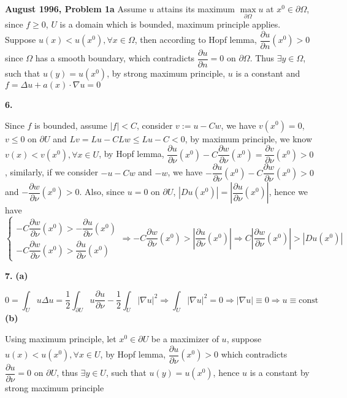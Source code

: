 \documentclass[../main.tex]{subfiles}
\begin{document}
\begin{customproblem}\textbf{August 1996, Problem 1a}
Assume $u$ attains its maximum $\displaystyle\underset{\partial\Omega}{\max}u$ at $x^0\in\partial\Omega$, since $f\geq 0$, $U$ is a domain which is bounded, maximum principle applies. Suppose $u(x)<u(x^0), \forall x\in \Omega$, then according to Hopf lemma, $\dfrac{\partial u}{\partial n}(x^0)>0$ since $\Omega$ has a smooth boundary, which contradicts $\dfrac{\partial u}{\partial n}=0$ on $\partial\Omega$. Thus $\exists y\in\Omega$, such that $u(y)=u(x^0)$, by strong maximum principle, $u$ is a constant and $f=\Delta u+a(x)\cdot\nabla u=0$ \par
\textbf{6.} \par
Since $f$ is bounded, assume $|f|<C$, consider $v:=u-Cw$, we have $v(x^0)=0$, $v\leq 0$ on $\partial U$ and $Lv=Lu-CLw\leq Lu-C<0$, by maximum principle, we know $v(x)<v(x^0), \forall x\in U$, by Hopf lemma, $\dfrac{\partial u}{\partial\nu}(x^0)-C\dfrac{\partial w}{\partial\nu}(x^0)=\dfrac{\partial v}{\partial\nu}(x^0)>0$, similarly, if we consider $-u-Cw$ and $-w$, we have $-\dfrac{\partial u}{\partial\nu}(x^0)-C\dfrac{\partial w}{\partial\nu}(x^0)>0$ and $-\dfrac{\partial w}{\partial\nu}(x^0)>0$. Also, since $u=0$ on $\partial U$, $\left|Du(x^0)\right|=\left|\dfrac{\partial u}{\partial\nu}(x^0)\right|$, hence we have
\[
\left\{
 \begin{matrix}
 -C\dfrac{\partial w}{\partial\nu}(x^0)>-\dfrac{\partial u}{\partial\nu}(x^0) \\
-C\dfrac{\partial w}{\partial\nu}(x^0)>\dfrac{\partial u}{\partial\nu}(x^0)
 \end{matrix}
\right.
\Rightarrow
-C\dfrac{\partial w}{\partial\nu}(x^0)>\left|\dfrac{\partial u}{\partial\nu}(x^0)\right|
\Rightarrow
C\left|\dfrac{\partial w}{\partial\nu}(x^0)\right|>\left|Du(x^0)\right|
\]
\end{customproblem}

\begin{customproblem}\textbf{7.}
\textbf{(a)} \par
\[
0=\int_U u\Delta u=\dfrac{1}{2}\int_{\partial U}u\dfrac{\partial u}{\partial\nu}-\dfrac{1}{2}\int_U |\nabla u|^2 \Rightarrow \int_U |\nabla u|^2=0 \Rightarrow |\nabla u|\equiv 0 \Rightarrow u\equiv \text{const}
\]
\textbf{(b)} \par
Using maximum principle, let $x^0\in\partial U$ be a maximizer of $u$, suppose $u(x)<u(x^0), \forall x\in U$, by Hopf lemma, $\dfrac{\partial u}{\partial\nu}(x^0)>0$ which contradicts $\dfrac{\partial u}{\partial\nu}=0$ on $\partial U$, thus $\exists y\in U$, such that $u(y)=u(x^0)$, hence $u$ is a constant by strong maximum principle
\end{customproblem}
\end{document}
